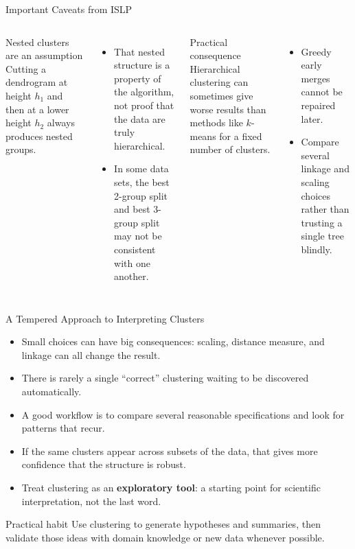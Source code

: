 \documentclass[aspectratio=169,11pt]{beamer}
\begin{document}
\begin{frame}[t]{Important Caveats from ISLP}
  \begin{columns}[T,totalwidth=\textwidth]
      \begin{block}{Nested clusters are an assumption}
        Cutting a dendrogram at height $h_1$ and then at a lower height $h_2$ always produces nested groups.
      \end{block}

      \begin{itemize}
        \item That nested structure is a property of the algorithm, not proof that the data are truly hierarchical.
        \item In some data sets, the best 2-group split and best 3-group split may not be consistent with one another.
      \end{itemize}
      \begin{block}{Practical consequence}
        Hierarchical clustering can sometimes give worse results than methods like $k$-means for a fixed number of clusters.
      \end{block}

      \begin{itemize}
        \item Greedy early merges cannot be repaired later.
        \item Compare several linkage and scaling choices rather than trusting a single tree blindly.
      \end{itemize}
  \end{columns}
\end{frame}

\begin{frame}[t]{A Tempered Approach to Interpreting Clusters}
  \begin{itemize}
    \item Small choices can have big consequences: scaling, distance measure, and linkage can all change the result.
    \item There is rarely a single ``correct'' clustering waiting to be discovered automatically.
    \item A good workflow is to compare several reasonable specifications and look for patterns that recur.
    \item If the same clusters appear across subsets of the data, that gives more confidence that the structure is robust.
    \item Treat clustering as an \textbf{exploratory tool}: a starting point for scientific interpretation, not the last word.
  \end{itemize}

  \vspace{0.6em}
  \begin{block}{Practical habit}
    Use clustering to generate hypotheses and summaries, then validate those ideas with domain knowledge or new data whenever possible.
  \end{block}
\end{frame}
\end{document}
